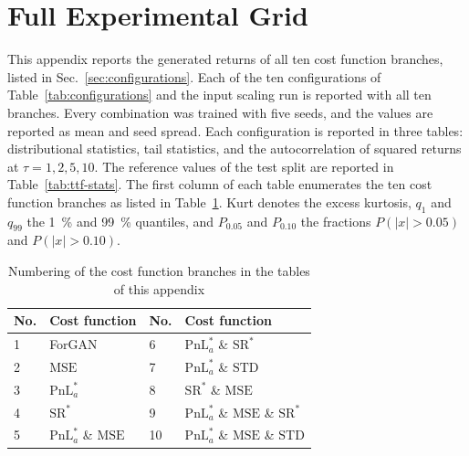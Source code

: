 \section{Full Experimental Grid}\label{app:grid}
\captionsetup[table]{list=no}
This appendix reports the generated returns of all ten cost function branches, listed in Sec.~\ref{sec:configurations}. 
Each of the ten configurations of Table~\ref{tab:configurations} and the input scaling run is reported with all ten branches. Every combination was trained with five seeds, and the values are reported as mean and seed spread. Each configuration is reported in three tables: distributional statistics, tail statistics, and the autocorrelation of squared returns at $\tau=1,2,5,10$. The reference values of the test split are reported in Table~\ref{tab:ttf-stats}. The first column of each table enumerates the ten cost function branches as listed in Table~\ref{tab:branch_key}. Kurt denotes the excess kurtosis, $q_{1}$ and $q_{99}$ the \SI{1}{\percent} and \SI{99}{\percent} quantiles, and $P_{0.05}$ and $P_{0.10}$ the fractions $P(|x| > 0.05)$ and $P(|x| > 0.10)$.

\begin{table}[H]
  \centering
  \small
  \begin{tabular}{llll}
    \toprule
    No. & Cost function & No. & Cost function \\
    \midrule
    1 & ForGAN                 & 6  & $\mathrm{PnL}^{*}_{a}$ \& $\mathrm{SR}^{*}$ \\
    2 & $\mathrm{MSE}$         & 7  & $\mathrm{PnL}^{*}_{a}$ \& $\mathrm{STD}$ \\
    3 & $\mathrm{PnL}^{*}_{a}$ & 8  & $\mathrm{SR}^{*}$ \& $\mathrm{MSE}$ \\
    4 & $\mathrm{SR}^{*}$      & 9  & $\mathrm{PnL}^{*}_{a}$ \& $\mathrm{MSE}$ \& $\mathrm{SR}^{*}$ \\
    5 & $\mathrm{PnL}^{*}_{a}$ \& $\mathrm{MSE}$ & 10 & $\mathrm{PnL}^{*}_{a}$ \& $\mathrm{MSE}$ \& $\mathrm{STD}$ \\
    \bottomrule
  \end{tabular}
  \caption{Numbering of the cost function branches in the tables of this appendix}
  \label{tab:branch_key}
\end{table}

\setlength{\intextsep}{5pt}
\setlength{\abovecaptionskip}{5pt}
\setlength{\belowcaptionskip}{5pt}


